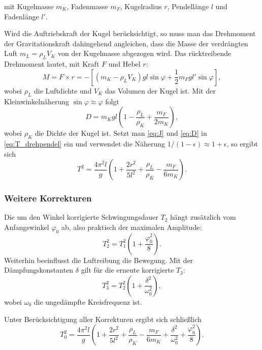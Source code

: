 mit Kugelmasse \(m_K\), Fadenmasse \(m_F\), Kugelradius \(r\), Pendellänge \(l\) und Fadenlänge \(l'\).

Wird die Auftriebskraft der Kugel berücksichtigt, so muss man das Drehmoment der Gravitationskraft dahingehend angleichen, dass die Masse der verdrängten Luft \(m_L=\rho_LV_K\) von der Kugelmasse abgezogen wird. Das rücktreibende Drehmoment lautet, mit Kraft \(F\) und Hebel \(r\):
\begin{equation}
    M = F\times r = -\left[\left(m_K - \rho_L V_K \right) g l \sin \varphi + \frac{1}{2} m_F g l' \sin \varphi \right],
    \label{eq:drehmoment}
\end{equation}
wobei \(\rho_L\) die Luftdichte und \(V_K\) das Volumen der Kugel ist. Mit der Kleinwinkelnäherung \(\sin\varphi \approx \varphi\) folgt
\begin{equation}
    D = m_K g l \left(1 - \frac{\rho_L}{\rho_K} + \frac{m_F}{2 m_K}\right),
    \label{eq:D}
\end{equation}
wobei \(\rho_K\) die Dichte der Kugel ist. Setzt man \cref{eq:J} und \cref{eq:D} in \cref{eq:T_drehpendel} ein und verwendet die Näherung \(1/(1-\epsilon) \approx 1+\epsilon\), so ergibt sich
\begin{equation}
    T^2 = \frac{4 \pi^2 l}{g} \left(1 + \frac{2r^2}{5l^2} + \frac{\rho_L}{\rho_K} - \frac{m_F}{6m_K}\right).
    \label{eq:T_korr1}
\end{equation}

\subsubsection{Weitere Korrekturen}
Die um den Winkel korrigierte Schwingungsdauer \(T_2\) hängt zusätzlich vom Anfangswinkel \(\varphi_0\) ab, also praktisch der maximalen Amplitude:
\begin{equation}
    T_2^2 = T_1^2 \left(1 + \frac{\varphi_0^2}{8}\right).
    \label{eq:T_winkel}
\end{equation}
Weiterhin beeinflusst die Luftreibung die Bewegung. Mit der Dämpfungskonstanten \(\delta\) gilt für die erneute korrigierte \(T_3\):
\begin{equation}
    T_3^2 = T_2^2 \left(1 + \frac{\delta^2}{\omega_0^2}\right),
    \label{eq:T_daempfung}
\end{equation}
wobei \(\omega_0\) die ungedämpfte Kreisfrequenz ist.

Unter Berücksichtigung aller Korrekturen ergibt sich schließlich
\begin{equation}
    T_0^2 = \frac{4\pi^2 l}{g} \left(1 + \frac{2r^2}{5l^2} + \frac{\rho_L}{\rho_K} - \frac{m_F}{6 m_K} + \frac{\delta^2}{\omega_0^2} + \frac{\varphi_0^2}{8}\right).
    \label{eq:T_gesamt}
\end{equation}

